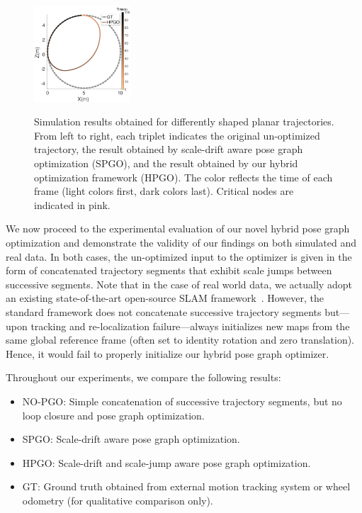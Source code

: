 \documentclass[letterpaper, 10 pt, conference]{ieeeconf}  %
\begin{document}
\begin{figure}[t]
\begin{minipage}[t]{0.49\textwidth}
{    \includegraphics[width=0.32\textwidth]{figures/simulation/circle5/HPGO-eps-converted-to.pdf}
    }
  \end{minipage}
  
  \caption{Simulation results obtained for differently shaped planar trajectories. From left to right, each triplet indicates the original un-optimized trajectory, the result obtained by scale-drift aware pose graph optimization (SPGO), and the result obtained by our hybrid optimization framework (HPGO). The color reflects the time of each frame (light colors first, dark colors last). Critical nodes are indicated in pink.}
  \label{fig:simulation_traj}
\end{figure}
\label{sec:experiments}

We now proceed to the experimental evaluation of our novel hybrid pose graph optimization and demonstrate the validity of our findings on both simulated and real data. In both cases, the un-optimized input to the optimizer is given in the form of concatenated trajectory segments that exhibit scale jumps between successive segments. Note that in the case of real world data, we actually adopt an existing state-of-the-art open-source SLAM framework~\cite{campos2021orb}. However, the standard framework does not concatenate successive trajectory segments but---upon tracking and re-localization failure---always initializes new maps from the same global reference frame (often set to identity rotation and zero translation). Hence, it would fail to properly initialize our hybrid pose graph optimizer.

Throughout our experiments, we compare the following results:
%
\begin{itemize}
  \item NO-PGO: Simple concatenation of successive trajectory segments, but no loop closure and pose graph optimization.
  \item SPGO: Scale-drift aware pose graph optimization.
  \item HPGO: Scale-drift and scale-jump aware pose graph optimization.
  \item GT: Ground truth obtained from external motion tracking system or wheel odometry (for qualitative comparison only).
\end{itemize}
\end{document}
